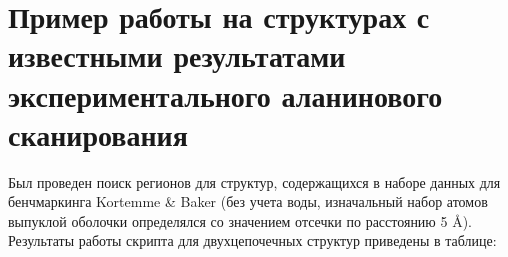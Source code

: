 \newpage


\section{Пример работы на структурах с известными результатами  экспериментального аланинового сканирования}





Был проведен поиск регионов для структур, содержащихся в наборе данных для бенчмаркинга Kortemme \& Baker \cite{kortemme_alascan_datasets} (без учета воды, изначальный набор атомов выпуклой оболочки определялся со значением отсечки по расстоянию 5 \AA{}). Результаты работы скрипта для двухцепочечных структур приведены в таблице:

